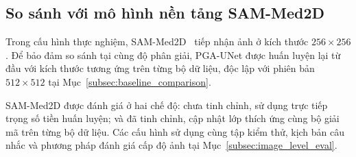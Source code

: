 \subsection{So sánh với mô hình nền tảng SAM-Med2D}
\label{subsec:sam_comparison}

Trong cấu hình thực nghiệm, SAM-Med2D~\cite{2023-SAMMed2D-Cheng} tiếp nhận ảnh ở kích thước $256\times256$. Để bảo đảm so sánh tại cùng độ phân giải, PGA-UNet được huấn luyện lại từ đầu với kích thước tương ứng trên từng bộ dữ liệu, độc lập với phiên bản $512\times512$ tại Mục~\ref{subsec:baseline_comparison}.

SAM-Med2D được đánh giá ở hai chế độ: chưa tinh chỉnh, sử dụng trực tiếp trọng số tiền huấn luyện; và đã tinh chỉnh, cập nhật lớp thích ứng cùng bộ giải mã trên từng bộ dữ liệu. Các cấu hình sử dụng cùng tập kiểm thử, kịch bản câu nhắc và phương pháp đánh giá cấp độ ảnh tại Mục~\ref{subsec:image_level_eval}.

\begin{table}[H]
    \centering
    \caption{So sánh PGA-UNet với SAM-Med2D trên BTXRD ở độ phân giải $256\times256$ (N=\Ntestimg~ảnh)}
    \label{tab:sam_comparison}
    \renewcommand{\arraystretch}{1.3}
\end{table}

